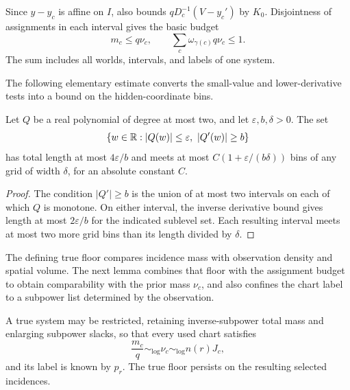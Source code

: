 Since \(y-y_c\) is affine on \(I\), 
also bounds \(qD_c^{-1}(V-y_c')\) by \(K_0\).
Disjointness of assignments in each interval gives the basic
budget
\begin{equation}
 m_c\le q\nu_c,\qquad
 \sum_c\omega_{\gamma(c)}q\nu_c\le1.
 \label{a01:assignment-budget}
\end{equation}
The sum includes all worlds, intervals, and labels of one system.

The following elementary estimate converts the small-value and
lower-derivative tests into a bound on the hidden-coordinate bins.

\begin{lemma}\label{lem:quadratic-sublevel}
Let \(Q\) be a real polynomial of degree at most two, and let
\(\varepsilon,b,\delta>0\). The set
\[
 \{w\in\mathbb R:|Q(w)|\le\varepsilon,
                  \ |Q'(w)|\ge b\}
\]
has total length at most \(4\varepsilon/b\) and meets at most
\(C(1+\varepsilon/(b\delta))\) bins of any grid of width
\(\delta\), for an absolute constant \(C\).
\end{lemma}

\begin{proof}
The condition \(|Q'|\ge b\) is the union of at most two
intervals on each of which \(Q\) is monotone. On either
interval, the inverse derivative bound gives length at most
\(2\varepsilon/b\) for the indicated sublevel set.
Each resulting interval meets at most two more grid bins than
its length divided by \(\delta\).
\end{proof}

The defining true floor compares incidence mass with observation
density and spatial volume. The next lemma combines that floor
with the assignment budget to obtain comparability with the prior
mass \(\nu_c\), and also confines the chart label to a subpower
list determined by the observation.

\begin{lemma}\label{a01:saturation}
A true system may be restricted, retaining inverse-subpower
total mass and enlarging subpower slacks, so that every used
chart satisfies
\begin{equation}
 \frac{m_c}{q}\sim_{\log}\nu_c\sim_{\log}n(r)J_c,
 \label{a01:saturated-floor}
\end{equation}
and its label is known by \(p_r\).
The true floor persists on the resulting selected incidences.
\end{lemma}

